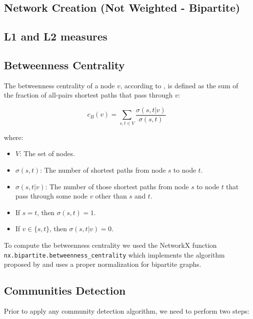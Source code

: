 
\subsection{Network Creation (Not Weighted - Bipartite)}

\subsection{L1 and L2 measures}


\subsection{Betweenness Centrality}
The betweenness centrality of a node $v$, according to  \cite{Brandes_2008}, 
is defined as the sum of the fraction of all-pairs shortest paths that pass through $v$:

\begin{equation}
    c_B(v) = \sum_{s,t \in V} \frac{\sigma(s, t|v)}{\sigma(s, t)} \label{eq:betweenness}
\end{equation}

\noindent
where:\\

\begin{itemize}
    \item $V$: The set of nodes.
    \item $\sigma(s, t)$: The number of shortest paths from node $s$ to node $t$.
    \item $\sigma(s, t|v)$: The number of those shortest paths from node $s$ to node $t$ that pass through some node $v$ other than $s$ and $t$.
    \item If $s = t$, then $\sigma(s, t) = 1$.
    \item If $v \in \{s, t\}$, then $\sigma(s, t|v) = 0$.
\end{itemize}

\vspace{0.2cm}
\noindent
To compute the betweenness centrality we used the NetworkX function \texttt{nx.bipartite.betweenness\_centrality} 
which implements the algorithm proposed by  \cite{Brandes_2004} and
uses a proper normalization for bipartite graphs.

\subsection{Communities Detection}
Prior to apply any community detection algorithm, we need to perform two steps:\\

